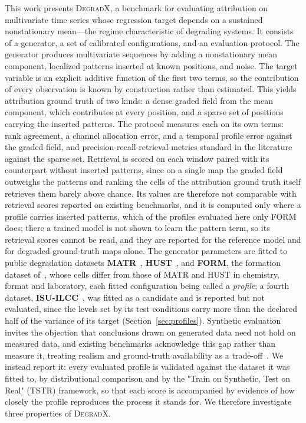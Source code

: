 \documentclass{article}
\newif\ifreview \reviewtrue        %
\newcommand{\rev}[1]{\ifreview\textcolor[HTML]{0B5FA5}{#1}\else#1\fi}
\newcommand{\revwhy}[1]{\ifreview\marginpar{\footnotesize\raggedright\textcolor[HTML]{0B5FA5}{#1}}\fi}
\newcommand{\revw}[1]{\ifreview\textcolor[HTML]{6FA8A0}{#1}\else#1\fi}   %
\begin{document}
This work presents \textsc{DegradX}, a benchmark for evaluating attribution on multivariate time series whose regression target depends on a sustained nonstationary mean—the regime characteristic of degrading systems. It consists of a generator, a set of calibrated configurations, and an evaluation protocol. The generator produces multivariate sequences by adding a nonstationary mean component, localized patterns inserted at known positions, and noise. The target variable is an explicit additive function of the first two terms, so the contribution of every observation is known by construction rather than estimated. This yields attribution ground truth of two kinds: a dense graded field from the mean component, which contributes at every position, and a sparse set of positions carrying the inserted patterns. The protocol measures each on its own terms: rank agreement\rev{, a channel allocation error, and a temporal profile error}\revwhy{X5: two added scores} against the graded field\revw{,} and precision-recall retrieval metrics standard in the literature~\cite{crabbe2021,queen2023} against the sparse set. \rev{Retrieval is scored on each window paired with its counterpart without inserted patterns, since on a single map the graded field outweighs the patterns and ranking the cells of the attribution ground truth itself retrieves them barely above chance. Its values are therefore not comparable with retrieval scores reported on existing benchmarks, and it is computed only where a profile carries inserted patterns, which of the profiles evaluated here only FORM does; there a trained model is not shown to learn the pattern term, so its retrieval scores cannot be read, and they are reported for the reference model and for degraded ground-truth maps alone.}\revwhy{FIX-1: plain retrieval near chance (D01); v2.1 (D34): patterns in FORM only, not shown to be learned by a trained model} The generator parameters are fitted to public degradation datasets \textbf{MATR}~\cite{severson2019}\revw{,} \textbf{HUST}~\cite{ma2022hust}\rev{, and \textbf{FORM}, the formation dataset of~\cite{cui2024formation}, whose cells differ from those of MATR and HUST in chemistry, format and laboratory}, each fitted configuration being called a \emph{profile}\rev{; a fourth dataset, \textbf{ISU-ILCC}~\cite{li2024ilcc}, was fitted as a candidate and is reported but not evaluated, since the levels set by its test conditions carry more than the declared half of the variance of its target (Section~\ref{sec:profiles})}.\revwhy{FIX-7, X6, v2.1: NASA PCoE replaced by FORM; ISU-ILCC reported, not evaluated} 
Synthetic evaluation invites the objection that conclusions drawn on generated data need not hold on measured data, and existing benchmarks acknowledge this gap rather than measure it, treating realism and ground-truth availability as a trade-off~\cite{xaibench2021}. We instead report it: every \rev{evaluated} profile is validated against the dataset it was fitted to, by distributional comparison and by the "Train on Synthetic, Test on Real" (TSTR) framework, so that each score is accompanied by evidence of how closely the profile reproduces the process it stands for. We therefore investigate three properties of \textsc{DegradX}.
 
\end{document}
